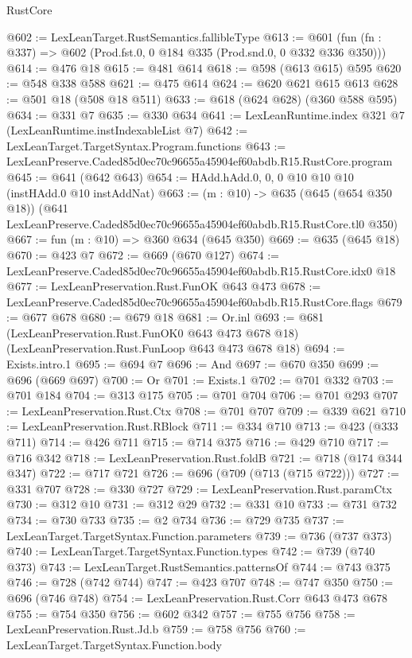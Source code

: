 \begin{lexlean}{RustCore}
\begin{coremodule}
@602 := LexLeanTarget.RustSemantics.fallibleType
@613 := @601 (fun (fn : @337) => @602 (Prod.fst.{0, 0} @184 @335 (Prod.snd.{0, 0} @332 @336 @350)))
@614 := @476 @18
@615 := @481 @614
@618 := @598 (@613 @615) @595
@620 := @548 @338 @588
@621 := @475 @614
@624 := @620 @621 @615 @613
@628 := @501 @18 (@508 @18 @511)
@633 := @618 (@624 @628) (@360 @588 @595)
@634 := @331 @7
@635 := @330 @634
@641 := LexLeanRuntime.index @321 @7 (LexLeanRuntime.instIndexableList @7)
@642 := LexLeanTarget.TargetSyntax.Program.functions
@643 := LexLeanPreserve.Caded85d0ec70c96655a45904ef60abdb.R15.RustCore.program
@645 := @641 (@642 @643)
@654 := HAdd.hAdd.{0, 0, 0} @10 @10 @10 (instHAdd.{0} @10 instAddNat)
@663 := (m : @10) ->
  @635
    (@645 (@654 @350 @18))
    (@641 LexLeanPreserve.Caded85d0ec70c96655a45904ef60abdb.R15.RustCore.tl0 @350)
@667 := fun (m : @10) => @360 @634 (@645 @350)
@669 := @635 (@645 @18)
@670 := @423 @7
@672 := @669 (@670 @127)
@674 := LexLeanPreserve.Caded85d0ec70c96655a45904ef60abdb.R15.RustCore.idx0 @18
@677 := LexLeanPreservation.Rust.FunOK @643 @473
@678 := LexLeanPreserve.Caded85d0ec70c96655a45904ef60abdb.R15.RustCore.flags
@679 := @677 @678
@680 := @679 @18
@681 := Or.inl
@693 := @681
    (LexLeanPreservation.Rust.FunOK0 @643 @473 @678 @18)
    (LexLeanPreservation.Rust.FunLoop @643 @473 @678 @18)
@694 := Exists.intro.{1}
@695 := @694 @7
@696 := And
@697 := @670 @350
@699 := @696 (@669 @697)
@700 := Or
@701 := Exists.{1}
@702 := @701 @332
@703 := @701 @184
@704 := @313 @175
@705 := @701 @704
@706 := @701 @293
@707 := LexLeanPreservation.Rust.Ctx
@708 := @701 @707
@709 := @339 @621
@710 := LexLeanPreservation.Rust.RBlock
@711 := @334 @710
@713 := @423 (@333 @711)
@714 := @426 @711
@715 := @714 @375
@716 := @429 @710
@717 := @716 @342
@718 := LexLeanPreservation.Rust.foldB
@721 := @718 (@174 @344 @347)
@722 := @717 @721
@726 := @696 (@709 (@713 (@715 @722)))
@727 := @331 @707
@728 := @330 @727
@729 := LexLeanPreservation.Rust.paramCtx
@730 := @312 @10
@731 := @312 @29
@732 := @331 @10
@733 := @731 @732
@734 := @730 @733
@735 := @2 @734
@736 := @729 @735
@737 := LexLeanTarget.TargetSyntax.Function.parameters
@739 := @736 (@737 @373)
@740 := LexLeanTarget.TargetSyntax.Function.types
@742 := @739 (@740 @373)
@743 := LexLeanTarget.RustSemantics.patternsOf
@744 := @743 @375
@746 := @728 (@742 @744)
@747 := @423 @707
@748 := @747 @350
@750 := @696 (@746 @748)
@754 := LexLeanPreservation.Rust.Corr @643 @473 @678
@755 := @754 @350
@756 := @602 @342
@757 := @755 @756
@758 := LexLeanPreservation.Rust.Jd.b
@759 := @758 @756
@760 := LexLeanTarget.TargetSyntax.Function.body

\end{coremodule}
\end{lexlean}

